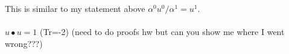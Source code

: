\documentclass[11pt,a4paper]{article}
\begin{document}
This is similar to my statement above $\alpha^0u^0/\alpha^1=u^1$.\\\\

$u\bullet u=1$ (Tr=-2)  (need to do proofs hw but can you show me where I went wrong???)





\end{document}
